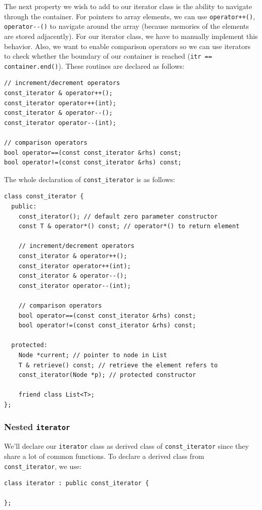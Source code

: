 \documentclass[12pt]{book}
\begin{document}
The next property we wish to add to our iterator class is the ability to navigate through the container. For pointers to array elements, we can use \texttt{operator++()}, \texttt{operator-{}-()} to navigate around the array (because memories of the elements are stored adjacently). For our iterator class, we have to manually implement this behavior. Also, we want to enable comparison operators so we can use iterators to check whether the boundary of our container is reached (\texttt{itr == container.end()}). These routines are declared as follows:
\begin{verbatim}
// increment/decrement operators
const_iterator & operator++();
const_iterator operator++(int);
const_iterator & operator--();
const_iterator operator--(int);

// comparison operators
bool operator==(const const_iterator &rhs) const;
bool operator!=(const const_iterator &rhs) const;
\end{verbatim}

The whole declaration of \texttt{const\_iterator} is as follows:
\begin{verbatim}
class const_iterator {
  public:
    const_iterator(); // default zero parameter constructor
    const T & operator*() const; // operator*() to return element

    // increment/decrement operators
    const_iterator & operator++();
    const_iterator operator++(int);
    const_iterator & operator--();
    const_iterator operator--(int);

    // comparison operators
    bool operator==(const const_iterator &rhs) const;
    bool operator!=(const const_iterator &rhs) const;

  protected:
    Node *current; // pointer to node in List
    T & retrieve() const; // retrieve the element refers to
    const_iterator(Node *p); // protected constructor

    friend class List<T>;
};
\end{verbatim}
\subsubsection{Nested \texttt{iterator}}
\label{sec:orgd5dc90e}
We'll declare our \texttt{iterator} class as derived class of \texttt{const\_iterator} since they share a lot of common functions. To declare a derived class from \texttt{const\_iterator}, we use:
\begin{verbatim}
class iterator : public const_iterator {

};
\end{verbatim}
\end{document}
